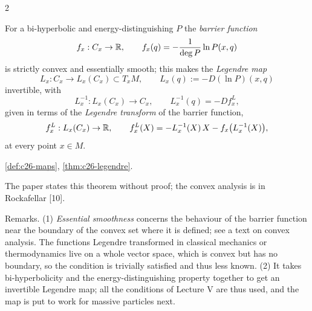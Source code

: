 \begin{paracol}{2}
\begin{theorem}\label{thm:c29-legendre}
For a bi-hyperbolic and energy-distinguishing $P$ the \emph{barrier function}
\[
  f_x:C_x\to\mathbb{R},\qquad f_x(q)=-\frac1{\deg P}\ln P(x,q)
\]
is strictly convex and essentially smooth; this makes the \emph{Legendre map}
\[
  L_x:C_x\to L_x(C_x)\subset T_xM,\qquad L_x(q):=-D(\ln P)(x,q)
\]
invertible, with
\[
  L_x^{-1}:L_x(C_x)\to C_x,\qquad L_x^{-1}(q)=-Df^L_x,
\]
given in terms of the \emph{Legendre transform} of the barrier function,
\[
  f^L_x:L_x(C_x)\to\mathbb{R},\qquad f^L_x(X)=-L_x^{-1}(X)\,X-f_x\bigl(L_x^{-1}(X)\bigr),
\]
at every point $x\in M$.
\end{theorem}
\begin{recall}
\cref{def:c26-maps}, \cref{thm:c26-legendre}.
\end{recall}
The paper states this theorem without proof; the convex analysis is in Rockafellar [10].

Remarks. (1) \emph{Essential smoothness} concerns the behaviour of the barrier function near the boundary of the convex set where it is defined; see a text on convex analysis. The functions Legendre transformed in classical mechanics or thermodynamics live on a whole vector space, which is convex but has no boundary, so the condition is trivially satisfied and thus less known. (2) It takes bi-hyperbolicity and the energy-distinguishing property together to get an invertible Legendre map; all the conditions of Lecture V are thus used, and the map is put to work for massive particles next.


\end{paracol}
